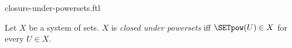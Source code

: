 \documentclass{naproche-library}
\begin{document}
\begin{smodule}[title=Closure Under Powersets]{closure-under-powersets.ftl}

\begin{definition}[forthel,id=FOUNDATIONS_14_4652013578120594]
  Let $X$ be a system of sets.
  $X$ is \emph{closed under powersets} iff $\SETpow(U) \in X$ for every $U \in X$.
\end{definition}
\end{smodule}
\end{document}

